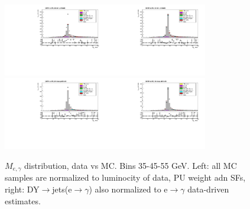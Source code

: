 \begin{figure}[htb]
\begin{center}
    \includegraphics[width=0.40\textwidth]{../figs/figs_v11/ELECTRON_WGamma/PrepareYields/c_TotalDATAvsMC_Barrel__Mpholep1PRELIMINARY_FOR_E_TO_GAMMA_WITH_PSV_CUT_pt45to55_.pdf}\includegraphics[width=0.40\textwidth]{../figs/figs_v11/ELECTRON_WGamma/PrepareYields/c_TotalDATAvsMC_Barrel__Mpholep1PRELIMINARY_FOR_E_TO_GAMMA_WITH_PSV_CUT_pt45to55__etogScale.pdf}\\
    \includegraphics[width=0.40\textwidth]{../figs/figs_v11/ELECTRON_WGamma/PrepareYields/c_TotalDATAvsMC_Endcap__Mpholep1PRELIMINARY_FOR_E_TO_GAMMA_WITH_PSV_CUT_pt45to55_.pdf}\includegraphics[width=0.40\textwidth]{../figs/figs_v11/ELECTRON_WGamma/PrepareYields/c_TotalDATAvsMC_Endcap__Mpholep1PRELIMINARY_FOR_E_TO_GAMMA_WITH_PSV_CUT_pt45to55__etogScale.pdf}\\
   \label{fig:Mpholep1DatavsMC_35to75}
  \caption{$M_{e,\gamma}$ distribution, data vs MC. Bins 35-45-55 GeV. Left: all MC samples are normalized to luminocity of data, PU weight adn SFs, right: DY$\rightarrow$jets(e$\rightarrow\gamma$) also normalized to e$\rightarrow\gamma$ data-driven estimates.}
  \end{center}
\end{figure}

